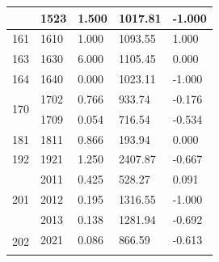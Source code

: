 \documentclass[12pt,a4paper]{article}
\begin{document}
{\begin{longtable}{@{}cllll@{}}
	& 1523                                         & 1.500                           & 1017.81                          & -1.000                           \\ \hline
	161                                             & 1610                                         & 1.000                           & 1093.55                          & 1.000                            \\ \hline
	163                                             & 1630                                         & 6.000                           & 1105.45                          & 0.000                            \\ \hline
	164                                             & 1640                                         & 0.000                           & 1023.11                          & -1.000                           \\ \hline
	\multirow{2}{*}{170}                            & 1702                                         & 0.766                           & 933.74                           & -0.176                           \\ \cline{2-5} 
	& 1709                                         & 0.054                           & 716.54                           & -0.534                           \\ \hline
	181                                             & 1811                                         & 0.866                           & 193.94                           & 0.000                            \\ \hline
	192                                             & 1921                                         & 1.250                           & 2407.87                          & -0.667                           \\ \hline
	\multirow{3}{*}{201}                            & 2011                                         & 0.425                           & 528.27                           & 0.091                            \\ \cline{2-5} 
	& 2012                                         & 0.195                           & 1316.55                          & -1.000                           \\ \cline{2-5} 
	& 2013                                         & 0.138                           & 1281.94                          & -0.692                           \\ \hline
	\multirow{4}{*}{202}                            & 2021                                         & 0.086                           & 866.59                           & -0.613                           \\ \cline{2-5} 

\end{longtable}}
\end{document}
